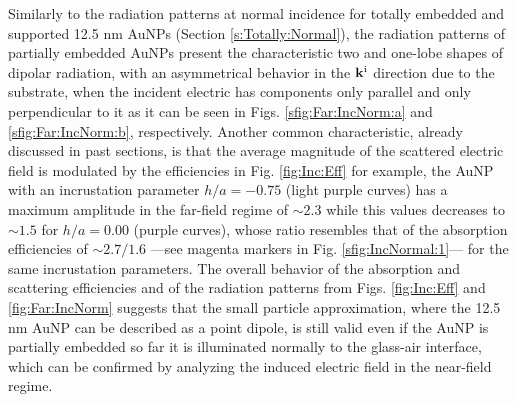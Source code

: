 Similarly to the radiation patterns at normal incidence for totally embedded and supported 12.5 nm AuNPs (Section \ref{s:Totally:Normal}), the radiation patterns of partially embedded AuNPs present the characteristic two and one-lobe shapes of dipolar radiation, with an asymmetrical behavior in the $\vb{k}^\text{i}$ direction due to the substrate, when  the incident electric has components only parallel and only perpendicular to it as it can be seen in Figs. \ref{sfig:Far:IncNorm:a} and \ref{sfig:Far:IncNorm:b}, respectively. Another common characteristic, already discussed in past sections, is that the average magnitude of the scattered electric field is modulated by the efficiencies in Fig. \ref{fig:Inc:Eff} for example, the AuNP with an incrustation parameter $h/a = -0.75$ (light purple curves) has a maximum amplitude in the far-field regime of $\sim  2.3  $ while this values decreases to $\sim 1.5$ for $h/a = 0.00$ (purple curves), whose ratio resembles that of the absorption efficiencies of $\sim 2.7/1.6$ ---see magenta markers in Fig. \ref{sfig:IncNormal:1}--- for the same incrustation parameters. The overall behavior of the absorption and scattering efficiencies and of the radiation patterns
from Figs. \ref{fig:Inc:Eff} and \ref{fig:Far:IncNorm} suggests that the small particle approximation, where the 12.5 nm AuNP can be described as a point dipole, is still valid even if the AuNP is partially embedded so far it is illuminated normally to the glass-air interface, which can be confirmed by analyzing the induced electric field in the near-field regime.

